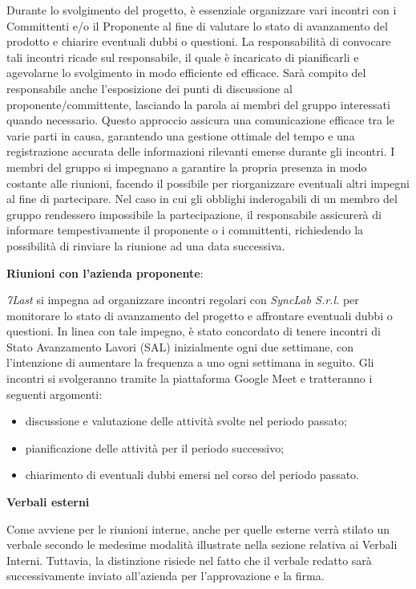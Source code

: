 Durante lo svolgimento del progetto, è essenziale organizzare vari incontri con i Committenti e/o il Proponente al fine di valutare lo stato di avanzamento del prodotto e chiarire eventuali dubbi o questioni.
La responsabilità di convocare tali incontri ricade sul responsabile, il quale è incaricato di pianificarli e agevolarne lo svolgimento in modo efficiente ed efficace.
Sarà compito del responsabile anche l’esposizione dei punti di discussione al proponente/committente, lasciando la parola ai membri del gruppo interessati quando necessario. Questo approccio assicura una comunicazione efficace tra le varie parti in causa, garantendo una gestione ottimale del tempo e una registrazione accurata delle informazioni rilevanti emerse durante gli incontri.
I membri del gruppo si impegnano a garantire la propria presenza in modo costante alle riunioni, facendo il possibile per riorganizzare eventuali altri impegni al fine di partecipare. Nel caso in cui gli obblighi inderogabili di un membro del gruppo rendessero impossibile la partecipazione, il responsabile assicurerà di informare tempestivamente il proponente o i committenti, richiedendo la possibilità di rinviare la riunione ad una data successiva.
\begin{flushleft}
\textbf{Riunioni con l'azienda proponente}:\\
\end{flushleft}
\textit{7Last} si impegna ad organizzare incontri regolari con \textit{SyncLab S.r.l.} per monitorare lo stato di avanzamento del progetto e affrontare eventuali dubbi o questioni. In linea con tale impegno, è stato concordato di tenere incontri di Stato Avanzamento Lavori (SAL) inizialmente ogni due settimane, con l'intenzione di aumentare la frequenza a uno ogni settimana in seguito. Gli incontri si svolgeranno tramite la piattaforma Google Meet e tratteranno i seguenti argomenti:
\begin{itemize}
    \item discussione e valutazione delle attività svolte nel periodo passato;
    \item pianificazione delle attività per il periodo successivo;
    \item chiarimento di eventuali dubbi emersi nel corso del periodo passato.
\end{itemize}
\begin{flushleft}
\textbf{Verbali esterni}
\end{flushleft}
Come avviene per le riunioni interne, anche per quelle esterne verrà stilato un verbale secondo le medesime modalità illustrate nella sezione relativa ai Verbali Interni. Tuttavia, la distinzione risiede nel fatto che il verbale redatto sarà successivamente inviato all'azienda per l'approvazione e la firma.

